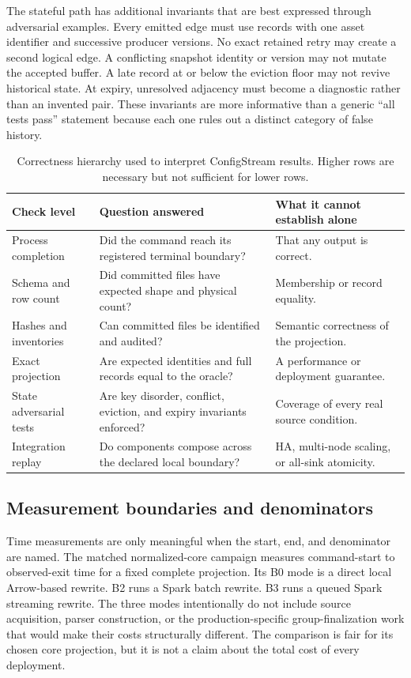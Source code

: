 \documentclass[a4paper,11pt]{article}
\begin{document}
The stateful path has additional invariants that are best expressed through adversarial examples. Every emitted edge must use records with one asset identifier and successive producer versions. No exact retained retry may create a second logical edge. A conflicting snapshot identity or version may not mutate the accepted buffer. A late record at or below the eviction floor may not revive historical state. At expiry, unresolved adjacency must become a diagnostic rather than an invented pair. These invariants are more informative than a generic ``all tests pass'' statement because each one rules out a distinct category of false history.

\begin{table}[ht]
\centering
\caption{Correctness hierarchy used to interpret ConfigStream results. Higher rows are necessary but not sufficient for lower rows.}
\label{tab:correctness-hierarchy}
\small
\begin{tabularx}{\textwidth}{p{}X X}
\toprule
Check level & Question answered & What it cannot establish alone \\
\midrule
Process completion & Did the command reach its registered terminal boundary? & That any output is correct. \\
Schema and row count & Did committed files have expected shape and physical count? & Membership or record equality. \\
Hashes and inventories & Can committed files be identified and audited? & Semantic correctness of the projection. \\
Exact projection & Are expected identities and full records equal to the oracle? & A performance or deployment guarantee. \\
State adversarial tests & Are key disorder, conflict, eviction, and expiry invariants enforced? & Coverage of every real source condition. \\
Integration replay & Do components compose across the declared local boundary? & HA, multi-node scaling, or all-sink atomicity. \\
\bottomrule
\end{tabularx}
\end{table}

\subsection{Measurement boundaries and denominators}

Time measurements are only meaningful when the start, end, and denominator are named. The matched normalized-core campaign measures command-start to observed-exit time for a fixed complete projection. Its B0 mode is a direct local Arrow-based rewrite. B2 runs a Spark batch rewrite. B3 runs a queued Spark streaming rewrite. The three modes intentionally do not include source acquisition, parser construction, or the production-specific group-finalization work that would make their costs structurally different. The comparison is fair for its chosen core projection, but it is not a claim about the total cost of every deployment.
\end{document}
